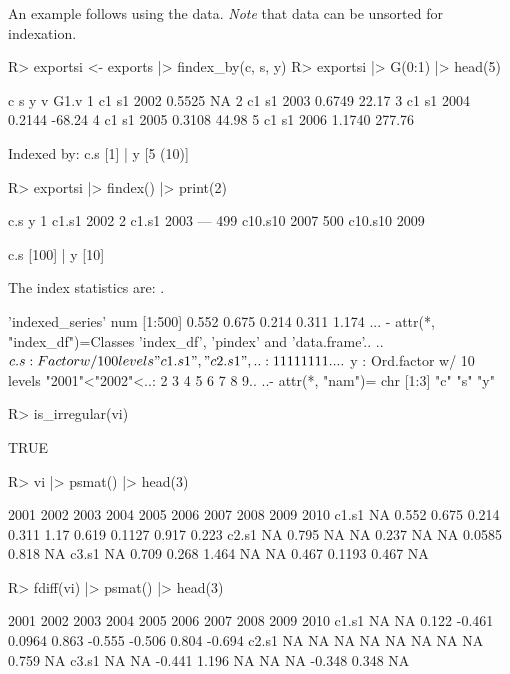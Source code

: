 \documentclass[nojss]{jss} %
\newcommand{\class}[1]{`\code{#1}'}
\begin{document}
An example follows using the  data. \emph{Note} that data can be unsorted for indexation.
\begin{Schunk}
\begin{Sinput}
R> exportsi <- exports |> findex_by(c, s, y)
R> exportsi |> G(0:1) |> head(5)
\end{Sinput}
\begin{Soutput}
   c  s    y      v   G1.v
1 c1 s1 2002 0.5525     NA
2 c1 s1 2003 0.6749  22.17
3 c1 s1 2004 0.2144 -68.24
4 c1 s1 2005 0.3108  44.98
5 c1 s1 2006 1.1740 277.76

Indexed by:  c.s [1] | y [5 (10)] 
\end{Soutput}
\begin{Sinput}
R> exportsi |> findex() |> print(2)
\end{Sinput}
\begin{Soutput}
    c.s    y
1 c1.s1 2002
2 c1.s1 2003
---                
499 c10.s10 2007
500 c10.s10 2009

c.s [100] | y [10]
\end{Soutput}
\end{Schunk}
The index statistics are: . %
\begin{Schunk}
\begin{Soutput}
 'indexed_series' num [1:500] 0.552 0.675 0.214 0.311 1.174 ...
 - attr(*, "index_df")=Classes 'index_df', 'pindex' and 'data.frame'..
  ..$ c.s: Factor w/ 100 levels "c1.s1","c2.s1",..: 1 1 1 1 1 1 1 1 ..
  ..$ y  : Ord.factor w/ 10 levels "2001"<"2002"<..: 2 3 4 5 6 7 8 9..
  ..- attr(*, "nam")= chr [1:3] "c" "s" "y"
\end{Soutput}
\begin{Sinput}
R> is_irregular(vi)
\end{Sinput}
\begin{Soutput}
[1] TRUE
\end{Soutput}
\begin{Sinput}
R> vi |> psmat() |> head(3)
\end{Sinput}
\begin{Soutput}
      2001  2002  2003  2004  2005 2006  2007   2008  2009  2010
c1.s1   NA 0.552 0.675 0.214 0.311 1.17 0.619 0.1127 0.917 0.223
c2.s1   NA 0.795    NA    NA 0.237   NA    NA 0.0585 0.818    NA
c3.s1   NA 0.709 0.268 1.464    NA   NA 0.467 0.1193 0.467    NA
\end{Soutput}
\begin{Sinput}
R> fdiff(vi) |> psmat() |> head(3)
\end{Sinput}
\begin{Soutput}
      2001 2002   2003   2004   2005  2006   2007   2008  2009   2010
c1.s1   NA   NA  0.122 -0.461 0.0964 0.863 -0.555 -0.506 0.804 -0.694
c2.s1   NA   NA     NA     NA     NA    NA     NA     NA 0.759     NA
c3.s1   NA   NA -0.441  1.196     NA    NA     NA -0.348 0.348     NA
\end{Soutput}
\end{Schunk}
\end{document}

